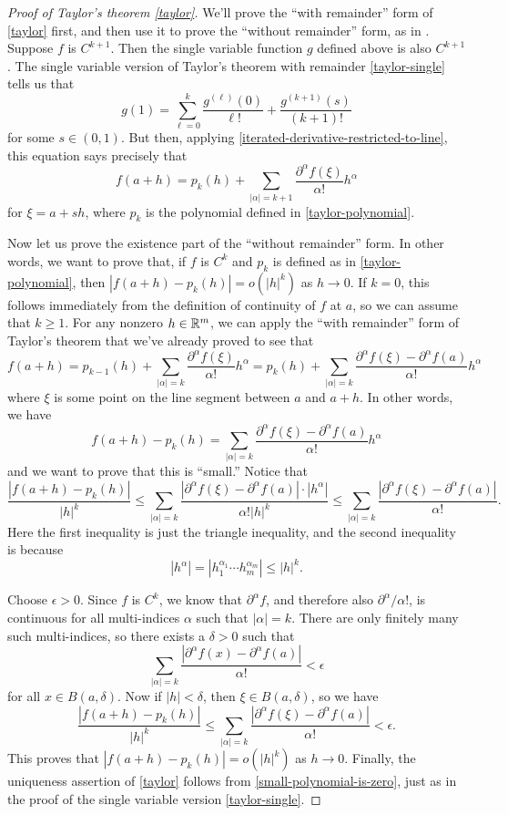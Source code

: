 \begin{proof}[Proof of Taylor's theorem \ref{taylor}]
	We'll prove the ``with remainder'' form of \cref{taylor} first, and then use it to prove the ``without remainder'' form, as in \cite[section 2.4]{konigsberger}. Suppose $f$ is $C^{k+1}$. Then the single variable function $g$ defined above is also $C^{k+1}$. The single variable version of Taylor's theorem with remainder \ref{taylor-single} tells us that
	\[ g(1) = \sum_{\ell = 0}^k \frac{g^{(\ell)}(0)}{\ell!} + \frac{g^{(k+1)}(s)}{(k+1)!} \]
	for some $s \in (0,1)$. But then, applying \cref{iterated-derivative-restricted-to-line}, this equation says precisely that 
	\[ f(a+h) = p_k(h) + \sum_{|\alpha| = k+1} \frac{\partial^{\alpha} f(\xi)}{\alpha!} h^\alpha \]
	for $\xi = a + sh$, where $p_k$ is the polynomial defined in \cref{taylor-polynomial}. 
	
	Now let us prove the existence part of the ``without remainder'' form. In other words, we want to prove that, if $f$ is $C^k$ and $p_k$ is defined as in \cref{taylor-polynomial}, then $|f(a+h) - p_k(h)| = o(|h|^k)$ as $h \to 0$. If $k = 0$, this follows immediately from the definition of continuity of $f$ at $a$, so we can assume that $k \geq 1$. For any nonzero $h \in \mathbb{R}^m$, we can apply the ``with remainder'' form of Taylor's theorem that we've already proved to see that
	\[ f(a+h) = p_{k-1}(h) + \sum_{|\alpha| = k} \frac{\partial^\alpha f(\xi)}{\alpha!} h^\alpha = p_k(h) + \sum_{|\alpha| = k} \frac{\partial^\alpha f(\xi) - \partial^\alpha f(a)}{\alpha!}h^\alpha \]
	where $\xi$ is some point on the line segment between $a$ and $a + h$. In other words, we have 
	\[ f(a+h) - p_k(h) = \sum_{|\alpha| = k} \frac{\partial^\alpha f(\xi) - \partial^\alpha f(a)}{\alpha!}h^\alpha \]
	and we want to prove that this is ``small.'' Notice that 
	\[ \frac{|f(a+h) - p_k(h)|}{|h|^k} \leq \sum_{|\alpha| = k} \frac{|\partial^\alpha f(\xi) - \partial^\alpha f(a)| \cdot |h^\alpha|}{\alpha! |h|^k} \leq \sum_{|\alpha| = k} \frac{|\partial^\alpha f(\xi) - \partial^\alpha f(a)|}{\alpha!}. \]
	Here the first inequality is just the triangle inequality, and the second inequality is because 
	\[ |h^\alpha| = |h_1^{\alpha_1} \dotsb h_m^{\alpha_m}| \leq |h|^k. \]
	
	Choose $\epsilon > 0$. Since $f$ is $C^k$, we know that $\partial^\alpha f$, and therefore also $\partial^\alpha/\alpha!$, is continuous for all multi-indices $\alpha$ such that $|\alpha| = k$. There are only finitely many such multi-indices, so there exists a $\delta > 0$ such that 
	\[ \sum_{|\alpha| = k} \frac{|\partial^\alpha f(x) - \partial^\alpha f(a)|}{\alpha!} < \epsilon \]
	for all $x \in B(a, \delta)$. Now if $|h| < \delta$, then $\xi \in B(a, \delta)$, so we have 
	\[ \frac{|f(a+h) - p_k(h)|}{|h|^k} \leq \sum_{|\alpha| = k} \frac{|\partial^\alpha f(\xi) - \partial^\alpha f(a)|}{\alpha!} < \epsilon. \]
	This proves that $|f(a+h) - p_k(h)| = o(|h|^k)$ as $h \to 0$. Finally, the uniqueness assertion of \cref{taylor} follows from \cref{small-polynomial-is-zero}, just as in the proof of the single variable version \ref{taylor-single}. 
\end{proof}

